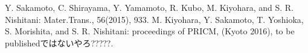 \documentclass[12pt,a4paper,dvipdfmx]{jsarticle}
\begin{document}
{\small\setlength\baselineskip{10pt}	%
\begin{thebibliography}{9}
Y. Sakamoto, C. Shirayama, Y. Yamamoto, R. Kubo, M. Kiyohara, and S. R. Nishitani: Mater.Trans., 56(2015), 933.
 M. Kiyohara, Y. Sakamoto, T. Yoshioka, S. Morishita, and S. R. Nishitani: proceedings of PRICM, (Kyoto 2016), to be publishedではないやろ?????.
\end{thebibliography}
}
\end{document}
